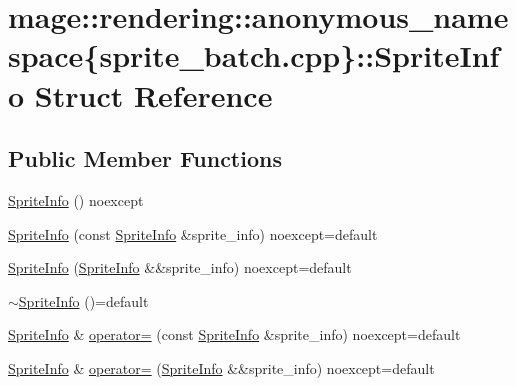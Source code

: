\hypertarget{structmage_1_1rendering_1_1anonymous__namespace_02sprite__batch_8cpp_03_1_1_sprite_info}{}\section{mage\+:\+:rendering\+:\+:anonymous\+\_\+namespace\{sprite\+\_\+batch.\+cpp\}\+:\+:Sprite\+Info Struct Reference}
\label{structmage_1_1rendering_1_1anonymous__namespace_02sprite__batch_8cpp_03_1_1_sprite_info}
\subsection*{Public Member Functions}
\begin{DoxyCompactItemize}
\item 
\mbox{\hyperlink{structmage_1_1rendering_1_1anonymous__namespace_02sprite__batch_8cpp_03_1_1_sprite_info_ad6c1783f45ecf0961b71fa03a4102f06}{Sprite\+Info}} () noexcept
\item 
\mbox{\hyperlink{structmage_1_1rendering_1_1anonymous__namespace_02sprite__batch_8cpp_03_1_1_sprite_info_a9e6db3f61c1696f6c55565e6ddfb05fa}{Sprite\+Info}} (const \mbox{\hyperlink{structmage_1_1rendering_1_1anonymous__namespace_02sprite__batch_8cpp_03_1_1_sprite_info}{Sprite\+Info}} \&sprite\+\_\+info) noexcept=default
\item 
\mbox{\hyperlink{structmage_1_1rendering_1_1anonymous__namespace_02sprite__batch_8cpp_03_1_1_sprite_info_ab9f311cff57a9056e9ac71d06ea304b6}{Sprite\+Info}} (\mbox{\hyperlink{structmage_1_1rendering_1_1anonymous__namespace_02sprite__batch_8cpp_03_1_1_sprite_info}{Sprite\+Info}} \&\&sprite\+\_\+info) noexcept=default
\item 
\mbox{\hyperlink{structmage_1_1rendering_1_1anonymous__namespace_02sprite__batch_8cpp_03_1_1_sprite_info_a5e59f4c0adfde9436161edec08be58b4}{$\sim$\+Sprite\+Info}} ()=default
\item 
\mbox{\hyperlink{structmage_1_1rendering_1_1anonymous__namespace_02sprite__batch_8cpp_03_1_1_sprite_info}{Sprite\+Info}} \& \mbox{\hyperlink{structmage_1_1rendering_1_1anonymous__namespace_02sprite__batch_8cpp_03_1_1_sprite_info_af04dac5e38f5b3586079f87a048b798b}{operator=}} (const \mbox{\hyperlink{structmage_1_1rendering_1_1anonymous__namespace_02sprite__batch_8cpp_03_1_1_sprite_info}{Sprite\+Info}} \&sprite\+\_\+info) noexcept=default
\item 
\mbox{\hyperlink{structmage_1_1rendering_1_1anonymous__namespace_02sprite__batch_8cpp_03_1_1_sprite_info}{Sprite\+Info}} \& \mbox{\hyperlink{structmage_1_1rendering_1_1anonymous__namespace_02sprite__batch_8cpp_03_1_1_sprite_info_ae7033feb2629de06f6d84b2178be0c02}{operator=}} (\mbox{\hyperlink{structmage_1_1rendering_1_1anonymous__namespace_02sprite__batch_8cpp_03_1_1_sprite_info}{Sprite\+Info}} \&\&sprite\+\_\+info) noexcept=default
\end{DoxyCompactItemize}
